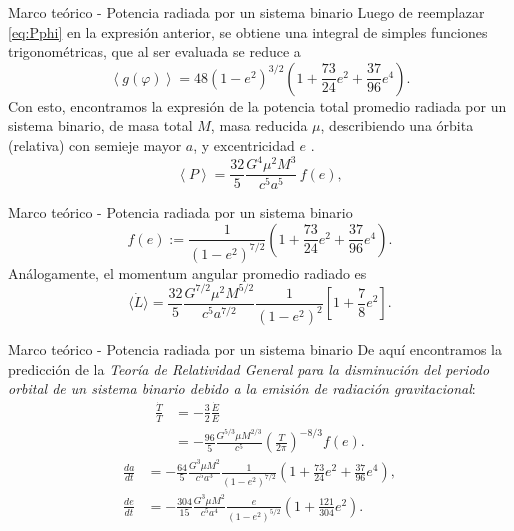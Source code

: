 \begin{frame}{Marco teórico - Potencia radiada por un sistema binario}
Luego de reemplazar \ref{eq:Pphi} en la expresión anterior, se obtiene una integral de simples funciones trigonométricas, que al ser evaluada se reduce a
\begin{equation*}
    \left\langle g(\varphi)\right\rangle= 48(1-e^2)^{3/2}\left(1+\frac{73}{24}e^2+\frac{37}{96}e^4\right).
    \end{equation*}
    Con esto, encontramos la expresión de la potencia total promedio radiada por un sistema binario, de masa total $M$, masa reducida $\mu$, describiendo una órbita (relativa) con semieje mayor $a$, y excentricidad $e$ \cite{PhysRev.131.435}.
    \begin{equation}\label{eq:PSbin}
    \left\langle P\right\rangle =\frac{32}{5}\frac{G^4\mu^2M^3}{c^5a^5}\,f(e),
    \end{equation}
\end{frame}
\begin{frame}{Marco teórico - Potencia radiada por un sistema binario}
    \begin{equation*}
        f(e):=\frac{1}{\left(1-e^2\right)^{7/2}}\left(1+\frac{73}{24}e^2+\frac{37}{96}e^4\right).
        \end{equation*}
        Análogamente, el momentum angular promedio radiado es
        \begin{equation*}
        \langle\dot{L}\rangle=\frac{32}{5}\frac{G^{7/2}\mu^{2}M^{5/2}}{c^5a^{7/2}}\frac{1}{(1-e^{2})^{2}}\left[1+\displaystyle\frac{7}{8}e^{2}\right].
        \end{equation*}
\end{frame}
\begin{frame}{Marco teórico - Potencia radiada por un sistema binario}
De aquí encontramos la predicción de la \textit{Teoría de Relatividad General para la disminución del periodo orbital de un sistema binario debido a la emisión de radiación gravitacional}:
\begin{align*}
\frac{\dot{T}}{T} &= -\frac{3}{2}\frac{\dot{E}}{E} \\
&= -\frac{96}{5} \frac{G^{5/3}\mu M^{2/3}}{c^5}\left(\frac{T}{2\pi}\right)^{-8/3}f(e).
\end{align*}
\vspace{-0.7cm}
\begin{align}
\frac{da}{dt} &= -\frac{64}{5}\frac{G^3\mu M^2}{c^5a^3}\frac{1}{\left(1-e^2\right)^{7/2}}\left(1+\frac{73}{24}e^2+\frac{37}{96}e^4\right) \label{eq:dadt},\\
\frac{de}{dt} &= -\frac{304}{15}\frac{G^3\mu M^2}{c^5a^4}\frac{e}{\left(1-e^2\right)^{5/2}}\left(1+\frac{121}{304}e^2\right). \label{eq:dedt}
\end{align}
\end{frame}
